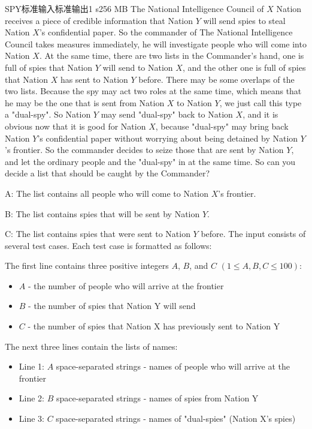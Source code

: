 \begin{problem}{SPY}{标准输入}{标准输出}{1 s}{256 MB}
The National Intelligence Council of $X$ Nation receives a piece of credible information that Nation $Y$ will send spies to steal Nation $X$'s confidential paper. So the commander of The National Intelligence Council takes measures immediately, he will investigate people who will come into Nation $X$. At the same time, there are two lists in the Commander's hand, one is full of spies that Nation $Y$ will send to Nation $X$, and the other one is full of spies that Nation $X$ has sent to Nation $Y$ before. There may be some overlaps of the two lists. Because the spy may act two roles at the same time, which means that he may be the one that is sent from Nation $X$ to Nation $Y$, we just call this type a "dual-spy". So Nation $Y$ may send "dual-spy" back to Nation $X$, and it is obvious now that it is good for Nation $X$, because "dual-spy" may bring back Nation $Y$'s confidential paper without worrying about being detained by Nation $Y$'s frontier. So the commander decides to seize those that are sent by Nation $Y$, and let the ordinary people and the "dual-spy" in at the same time. So can you decide a list that should be caught by the Commander? 

A: The list contains all people who will come to Nation $X$'s frontier. 

B: The list contains spies that will be sent by Nation $Y$. 

C: The list contains spies that were sent to Nation $Y$ before.
    \InputFile
The input consists of several test cases. Each test case is formatted as follows:

The first line contains three positive integers $A$, $B$, and $C$ $(1 \leq A,B,C \leq 100)$:
\begin{itemize}
    \item $A$ - the number of people who will arrive at the frontier
    \item $B$ - the number of spies that Nation Y will send
    \item $C$ - the number of spies that Nation X has previously sent to Nation Y
\end{itemize}

The next three lines contain the lists of names:
\begin{itemize}
    \item Line 1: $A$ space-separated strings - names of people who will arrive at the frontier
    \item Line 2: $B$ space-separated strings - names of spies from Nation Y
    \item Line 3: $C$ space-separated strings - names of "dual-spies" (Nation X's spies)
\end{itemize}


\end{problem}
